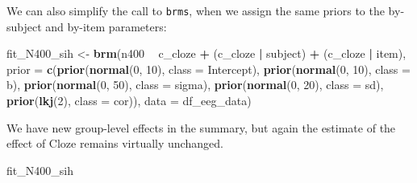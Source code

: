 \documentclass[12pt,]{krantz}
\newenvironment{Shaded}{\begin{snugshade}}{\end{snugshade}}
\newcommand{\KeywordTok}[1]{\textcolor[rgb]{0.13,0.29,0.53}{\textbf{#1}}}
\newcommand{\DataTypeTok}[1]{\textcolor[rgb]{0.13,0.29,0.53}{#1}}
\newcommand{\DecValTok}[1]{\textcolor[rgb]{0.00,0.00,0.81}{#1}}
\newcommand{\StringTok}[1]{\textcolor[rgb]{0.31,0.60,0.02}{#1}}
\newcommand{\OperatorTok}[1]{\textcolor[rgb]{0.81,0.36,0.00}{\textbf{#1}}}
\newcommand{\NormalTok}[1]{#1}
\theoremstyle{definition}
\theoremstyle{definition}
\theoremstyle{definition}
\theoremstyle{remark}
\begin{document}
We can also simplify the call to \texttt{brms}, when we assign the same
priors to the by-subject and by-item parameters:

\begin{Shaded}
\begin{Highlighting}[]
\NormalTok{fit_N400_sih <-}\StringTok{ }\KeywordTok{brm}\NormalTok{(n400 }\OperatorTok{~}\StringTok{ }\NormalTok{c_cloze }\OperatorTok{+}\StringTok{ }\NormalTok{(c_cloze }\OperatorTok{|}\StringTok{ }\NormalTok{subject) }\OperatorTok{+}\StringTok{ }\NormalTok{(c_cloze }\OperatorTok{|}\StringTok{ }\NormalTok{item),}
                  \DataTypeTok{prior =}
                      \KeywordTok{c}\NormalTok{(}\KeywordTok{prior}\NormalTok{(}\KeywordTok{normal}\NormalTok{(}\DecValTok{0}\NormalTok{, }\DecValTok{10}\NormalTok{), }\DataTypeTok{class =}\NormalTok{ Intercept),}
                        \KeywordTok{prior}\NormalTok{(}\KeywordTok{normal}\NormalTok{(}\DecValTok{0}\NormalTok{, }\DecValTok{10}\NormalTok{), }\DataTypeTok{class =}\NormalTok{ b),}
                        \KeywordTok{prior}\NormalTok{(}\KeywordTok{normal}\NormalTok{(}\DecValTok{0}\NormalTok{, }\DecValTok{50}\NormalTok{), }\DataTypeTok{class =}\NormalTok{ sigma),}
                        \KeywordTok{prior}\NormalTok{(}\KeywordTok{normal}\NormalTok{(}\DecValTok{0}\NormalTok{, }\DecValTok{20}\NormalTok{), }\DataTypeTok{class =}\NormalTok{ sd),}
                        \KeywordTok{prior}\NormalTok{(}\KeywordTok{lkj}\NormalTok{(}\DecValTok{2}\NormalTok{), }\DataTypeTok{class =}\NormalTok{ cor)),}
                  \DataTypeTok{data =}\NormalTok{ df_eeg_data)}
\end{Highlighting}
\end{Shaded}

We have new group-level effects in the summary, but again the estimate
of the effect of Cloze remains virtually unchanged.

\begin{Shaded}
\begin{Highlighting}[]
\NormalTok{fit_N400_sih}
\end{Highlighting}
\end{Shaded}
\end{document}
